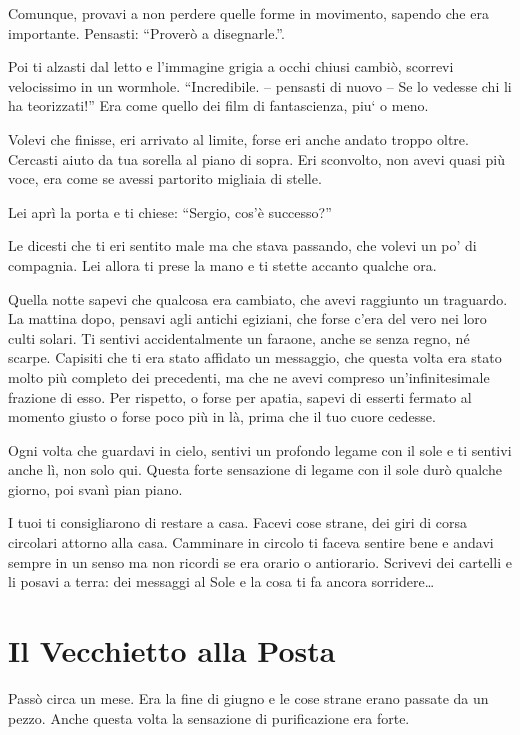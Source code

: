 Comunque, provavi a non perdere quelle forme in movimento, sapendo che era importante. Pensasti: ``Proverò a disegnarle.''.

Poi ti alzasti dal letto e l'immagine grigia a occhi chiusi cambiò, scorrevi velocissimo in un wormhole. ``Incredibile. -- pensasti di nuovo -- Se lo vedesse chi li ha teorizzati!'' Era come quello dei film di fantascienza, piu` o meno.

Volevi che finisse, eri arrivato al limite, forse eri anche andato troppo oltre. Cercasti aiuto da tua sorella al piano di sopra. Eri sconvolto, non avevi quasi più voce, era come se avessi partorito migliaia di stelle.

Lei aprì la porta e ti chiese: “Sergio, cos'è successo?”

Le dicesti che ti eri sentito male ma che stava passando, che volevi un po' di compagnia. Lei allora ti prese la mano e ti stette accanto qualche ora.

Quella notte sapevi che qualcosa era cambiato, che avevi raggiunto un traguardo. La mattina dopo, pensavi agli antichi egiziani, che forse c'era del vero nei loro culti solari. Ti sentivi accidentalmente un faraone, anche se senza regno, né scarpe.  Capisiti che ti era stato affidato un messaggio, che questa volta era stato molto più completo dei precedenti, ma che ne avevi compreso un'infinitesimale frazione di esso.  Per rispetto, o forse per apatia, sapevi di esserti fermato al momento giusto o forse poco più in là, prima che il tuo cuore cedesse.

Ogni volta che guardavi in cielo, sentivi un profondo legame con il sole e ti sentivi anche lì, non solo qui.  Questa forte sensazione di legame con il sole durò qualche giorno, poi svanì pian piano.

I tuoi ti consigliarono di restare a casa. Facevi cose strane, dei giri di corsa circolari attorno alla casa. Camminare in circolo ti faceva sentire bene e andavi sempre in un senso ma non ricordi se era orario o antiorario.  Scrivevi dei cartelli e li posavi a terra: dei messaggi al Sole e la cosa ti fa ancora sorridere\ldots

\section{Il Vecchietto alla Posta}
\label{il_vecchietto}

Passò circa un mese. Era la fine di giugno e le cose strane erano passate da un pezzo. Anche questa volta la sensazione di purificazione era forte.

